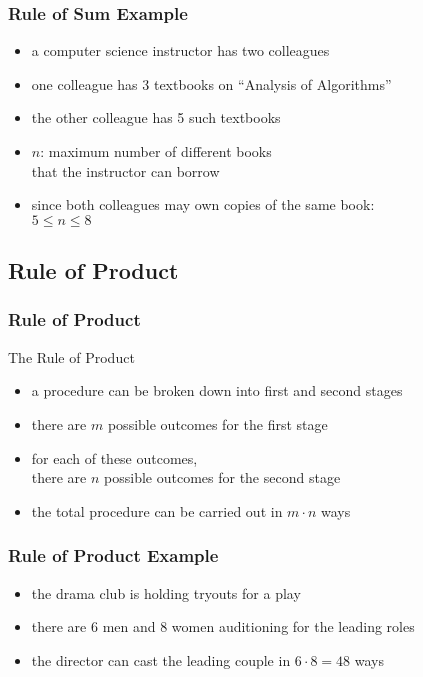 \documentclass[dvipsnames]{beamer}
\begin{document}
\begin{frame}
  \frametitle{Rule of Sum Example}

  \begin{example}
    \begin{itemize}
      \item a computer science instructor has two colleagues
      \item one colleague has 3 textbooks on ``Analysis of Algorithms''
      \item the other colleague has 5 such textbooks

      \medskip
      \item $n$: maximum number of different books\\
        that the instructor can borrow
      \item since both colleagues may own copies of the same book:\\
        $5 \leq n \leq 8$
   \end{itemize}
  \end{example}
\end{frame}

\subsection{Rule of Product}

\begin{frame}
  \frametitle{Rule of Product}

  \begin{block}{The Rule of Product}
    \begin{itemize}
      \item a procedure can be broken down into first and second stages
      \item there are $m$ possible outcomes for the first stage
      \item for each of these outcomes,\\
        there are $n$ possible outcomes for the second stage

      \medskip
      \item the total procedure can be carried out in $m \cdot n$ ways
    \end{itemize}
  \end{block}
\end{frame}

\begin{frame}
  \frametitle{Rule of Product Example}

  \begin{example}
    \begin{itemize}
      \item the drama club is holding tryouts for a play
      \item there are 6 men and 8 women auditioning for the leading roles

      \medskip
      \item the director can cast the leading couple in
        $6 \cdot 8 = 48$ ways
    \end{itemize}
  \end{example}
\end{frame}
\end{document}

